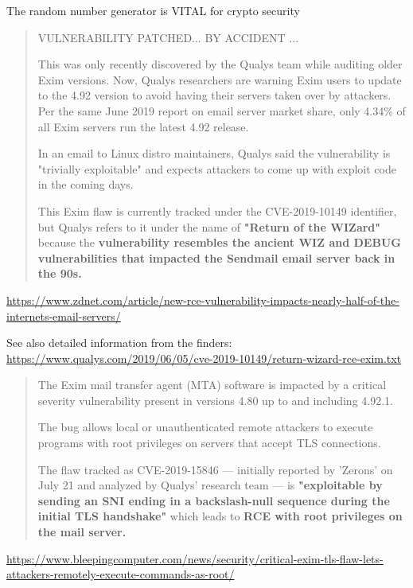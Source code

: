 \documentclass[Screen16to9,17pt]{foils}
\begin{document}
\centerline{The random number generator is VITAL for crypto security}



\begin{quote}
  VULNERABILITY PATCHED... BY ACCIDENT
...

This was only recently discovered by the Qualys team while auditing older Exim versions. Now, Qualys researchers are warning Exim users to update to the 4.92
version to avoid having their servers taken over by attackers. Per the same June 2019 report on email server market share, only 4.34\% of all Exim servers run
the latest 4.92 release.

In an email to Linux distro maintainers, Qualys said the vulnerability is "trivially exploitable" and expects attackers to come up with exploit code in the
coming days.

This Exim flaw is currently tracked under the CVE-2019-10149 identifier, but Qualys refers to it under the name of \textbf{"Return of the WIZard"} because the
\textbf{vulnerability resembles the ancient WIZ and DEBUG vulnerabilities that impacted the Sendmail email server back in the 90s.}
\end{quote}

{\footnotesize\url{https://www.zdnet.com/article/new-rce-vulnerability-impacts-nearly-half-of-the-internets-email-servers/}}

See also detailed information from the finders:\\ \url{https://www.qualys.com/2019/06/05/cve-2019-10149/return-wizard-rce-exim.txt}


\begin{quote}
The Exim mail transfer agent (MTA) software is impacted by a critical severity vulnerability present in versions 4.80 up to and including 4.92.1.

The bug allows local or unauthenticated remote attackers to execute programs with root privileges on servers that accept TLS connections.

The flaw tracked as CVE-2019-15846 — initially reported by 'Zerons' on July 21 and analyzed by Qualys' research team — is \textbf{"exploitable by sending an SNI ending in a backslash-null sequence during the initial TLS handshake"} which leads to \textbf{RCE with root privileges on the mail server.}
\end{quote}

\url{https://www.bleepingcomputer.com/news/security/critical-exim-tls-flaw-lets-attackers-remotely-execute-commands-as-root/}
\end{document}
